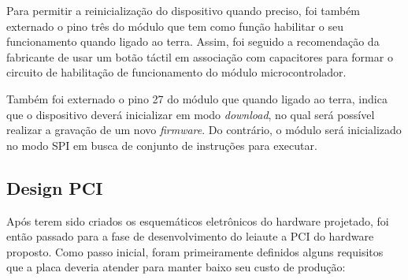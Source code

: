 Para permitir a reinicialização do dispositivo quando preciso, foi também externado o pino três do módulo que tem como função habilitar o seu funcionamento quando ligado ao terra. Assim, foi seguido a recomendação da fabricante de usar um botão táctil em associação com capacitores para formar o circuito de habilitação de funcionamento do módulo microcontrolador.

Também foi externado o pino 27 do módulo que quando ligado ao terra, indica que o dispositivo deverá inicializar em modo \textit{download}, no qual será possível realizar a gravação de um novo \textit{firmware}. Do contrário, o módulo será inicializado no modo \gls{SPI} em busca de conjunto de instruções para executar. 

    \begin{figure}[h!]
            \captionsetup{width=10cm}
   \end{figure}  





\subsection{Design PCI}




Após terem sido criados os esquemáticos eletrônicos do hardware projetado, foi então passado para a fase de desenvolvimento do leiaute a \gls{PCI} do hardware proposto. Como passo inicial, foram primeiramente definidos alguns requisitos que a placa deveria atender para manter baixo seu custo de produção:

